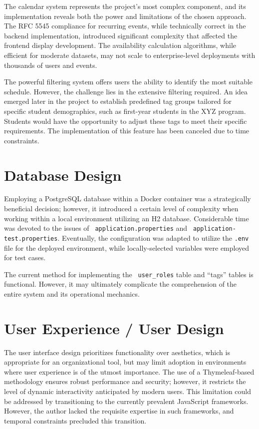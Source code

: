 The calendar system represents the project's most complex component, and its implementation reveals both the power and limitations of the chosen approach.
The RFC 5545 compliance for recurring events, while technically correct in the backend implementation, introduced significant complexity that affected the frontend display development.
The availability calculation algorithms, while efficient for moderate datasets, may not scale to enterprise-level deployments with thousands of users and events.

The powerful filtering system offers users the ability to identify the most suitable schedule.
However, the challenge lies in the extensive filtering required.
An idea emerged later in the project to establish predefined tag groups tailored for specific student demographics, such as first-year students in the XYZ program.
Students would have the opportunity to adjust these tags to meet their specific requirements.
The implementation of this feature has been canceled due to time constraints.


\section{Database Design}\label{sec:database-design2}

Employing a PostgreSQL database within a Docker container was a strategically beneficial decision; however, it introduced a certain level of complexity when working within a local environment utilizing an H2 database.
Considerable time was devoted to the issues of \texttt{ application.properties} and \texttt{ application-test.properties}.
Eventually, the configuration was adapted to utilize the \texttt{.env} file for the deployed environment, while locally-selected variables were employed for test cases.

The current method for implementing the \texttt{ user\_roles} table and ``tags'' tables is functional.
However, it may ultimately complicate the comprehension of the entire system and its operational mechanics.

\newpage

\section{User Experience / User Design}\label{sec:user-experience-/-user-design}

The user interface design prioritizes functionality over aesthetics, which is appropriate for an organizational tool, but may limit adoption in environments where user experience is of the utmost importance.
The use of a Thymeleaf-based methodology ensures robust performance and security; however, it restricts the level of dynamic interactivity anticipated by modern users.
This limitation could be addressed by transitioning to the currently prevalent JavaScript frameworks.
However, the author lacked the requisite expertise in such frameworks, and temporal constraints precluded this transition.

